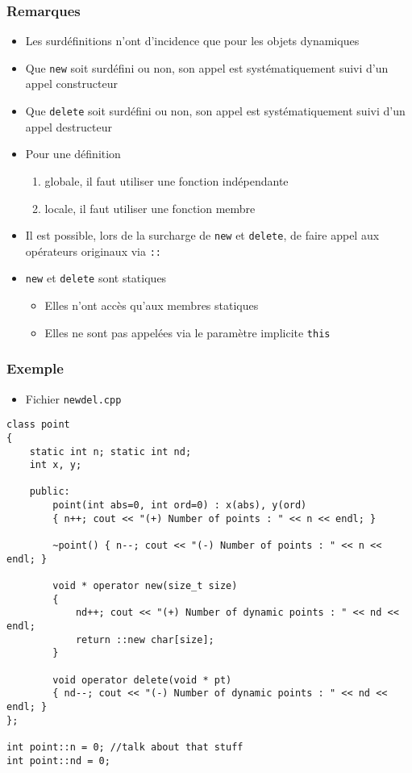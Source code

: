 \begin{frame}
\frametitle{Remarques}
\begin{itemize}[<+->]
\item Les surdéfinitions n'ont d'incidence que pour les objets dynamiques
\item Que \lstinline|new| soit surdéfini ou non, son appel est systématiquement suivi d'un appel constructeur
\item Que \lstinline|delete| soit surdéfini ou non, son appel est systématiquement suivi d'un appel destructeur
\item Pour une définition
	\begin{enumerate}
	\item globale, il faut utiliser une fonction indépendante
	\item locale, il faut utiliser une fonction membre
	\end{enumerate}
\item Il est possible, lors de la surcharge de \lstinline|new| et \lstinline|delete|, de faire appel aux opérateurs originaux via \texttt{::}
\item \lstinline|new| et \lstinline|delete| sont statiques
	\begin{itemize}
	\item Elles n'ont accès qu'aux membres statiques
	\item Elles ne sont pas appelées via le paramètre implicite \lstinline|this|
	\end{itemize}
\end{itemize}
\end{frame}

\begin{frame}[containsverbatim]
\frametitle{Exemple}
\begin{itemize}
\item Fichier \texttt{newdel.cpp}
\end{itemize}
\begin{lstlisting}
class point
{
	static int n; static int nd;
	int x, y;

	public:
		point(int abs=0, int ord=0) : x(abs), y(ord) 
		{ n++; cout << "(+) Number of points : " << n << endl; }

		~point() { n--; cout << "(-) Number of points : " << n << endl; }

		void * operator new(size_t size)
		{
			nd++; cout << "(+) Number of dynamic points : " << nd << endl;
			return ::new char[size];
		}

		void operator delete(void * pt)
		{ nd--; cout << "(-) Number of dynamic points : " << nd << endl; }
};

int point::n = 0; //talk about that stuff
int point::nd = 0;
\end{lstlisting}
\end{frame}

